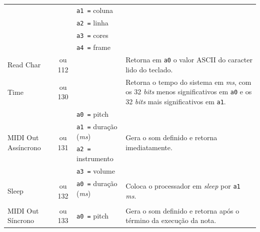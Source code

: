 \begin{longtable}{|l|c|p{3cm}|l |}
            & & \texttt{a1 =} coluna      & \\*
            & & \texttt{a2 =} linha       & \\*
            & & \texttt{a3 =} cores       & \\*
            & & \texttt{a4 =} frame       & \\
        \hline
        \multirow{3}{*}{Read Char}          & \multirow{3}{*}{\parbox{0.6cm}{ ou 112}}
            &                               & \multirow{3}{*}{\parbox{7cm}{Retorna em \texttt{a0} o valor ASCII do caracter lido do teclado.}}\\*
            & & & \\*
            & & & \\
        \hline
        \multirow{3}{*}{Time}               & \multirow{3}{*}{\parbox{0.6cm}{ ou 130}}
            &                               & \multirow{3}{*}{\parbox{7cm}{Retorna o tempo do sistema em \textit{ms}, com os 32 \textit{bits} menos significativos em \texttt{a0}
                                                e os 32 \textit{bits} mais significativos em \texttt{a1}.}}\\*
            & & & \\*
            & & & \\
        \hline
        \multirow{4}{*}{MIDI Out Assíncrono }   & \multirow{4}{*}{\parbox{0.6cm}{ ou 131}}
              & \texttt{a0 =} pitch       & \multirow{4}{*}{\parbox{7cm}{Gera o som definido e retorna imediatamente.}}\\*
            & & \texttt{a1 =} duração (\textit{ms}) & \\*
            & & \texttt{a2 =} instrumento & \\*
            & & \texttt{a3 =} volume      & \\
        \hline
        \multirow{3}{*}{Sleep}              & \multirow{3}{*}{\parbox{0.6cm}{ ou 132}}
            & \texttt{a0 =} duração (\textit{ms}) & \multirow{3}{*}{\parbox{7cm}{Coloca o processador em \textit{sleep} por \texttt{a1} \textit{ms}.}}\\*
            & & & \\*
            & & & \\
        \hline
        \multirow{4}{*}{MIDI Out Síncrono }     & \multirow{4}{*}{\parbox{0.6cm}{ ou 133}}
              & \texttt{a0 =} pitch       & \multirow{4}{*}{\parbox{7cm}{Gera o som definido e retorna após o término da execução da nota.}}\\*

\end{longtable}
